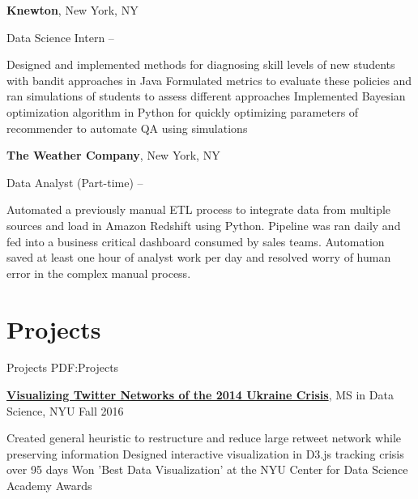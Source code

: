 \documentclass[letterpaper,9.5pt,oneside]{article}
\begin{document}
\begin{body}
\BigGap

\textbf{Knewton},
New York, NY

\GapNoBreak
Data Science Intern
\hfill
{} --
\begin{detail}
\BulletItem Designed and implemented methods for diagnosing skill levels of new students with bandit approaches in Java
\BulletItem
Formulated metrics to evaluate these policies and ran simulations of students to assess different approaches
\BulletItem Implemented Bayesian optimization algorithm in Python for quickly optimizing parameters of recommender to automate QA using simulations
\end{detail}

\BigGap

\textbf{The Weather Company},
New York, NY

\GapNoBreak
Data Analyst (Part-time)
\hfill
{} --
\begin{detail}
\BulletItem
Automated a previously manual ETL process to integrate data from multiple sources and load in Amazon Redshift using Python. Pipeline was ran daily and fed into a business critical dashboard consumed by sales teams. Automation saved at least one hour of analyst work per day and resolved worry of human error in the complex manual process.
\end{detail}

\BigGap



\section
{Projects}
{Projects}
{PDF:Projects}

\href{http://cims.nyu.edu/~ceb545/LaSNe/viz/graph_line.html}
{\textbf{Visualizing Twitter Networks of the 2014 Ukraine Crisis}},
MS in Data Science, NYU \hfill
Fall 2016

\GapNoBreak
\begin{detail}
\BulletItem
Created general heuristic to restructure and reduce large retweet network while preserving information
\BulletItem Designed interactive visualization in D3.js tracking crisis over 95 days 
\BulletItem Won 'Best Data Visualization' at the NYU Center for Data Science Academy Awards
\end{detail}



\end{body}
\end{document}
